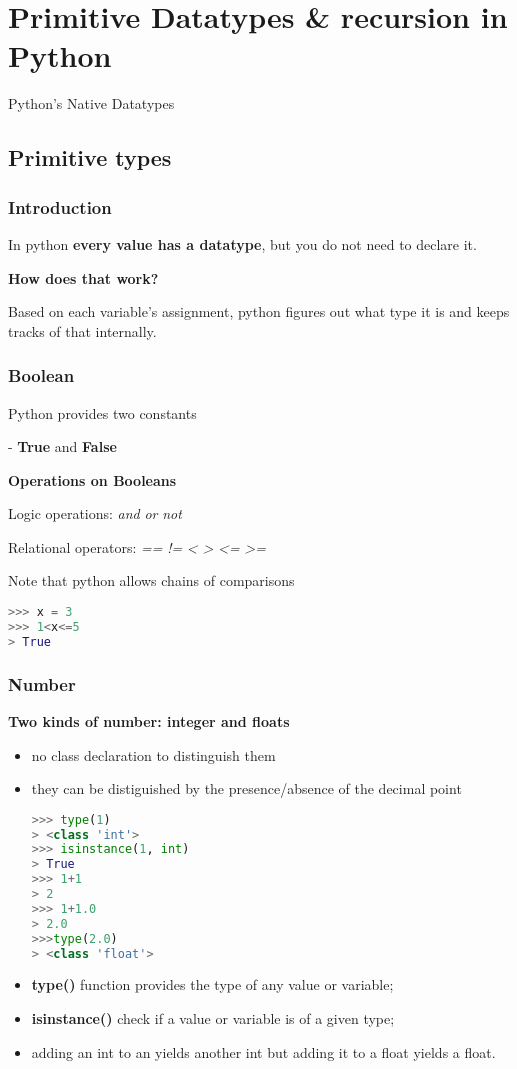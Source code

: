 \section{Primitive Datatypes \& recursion in Python}

Python's Native Datatypes

\subsection{Primitive types}

\subsubsection{Introduction}
In python \textbf{every value has a datatype}, but you do not need to declare it.

\textbf{How does that work?}

Based on each variable's assignment, python figures out what type it is and keeps tracks of that internally.

\subsubsection{Boolean}
Python provides two constants

- \textbf{True} and \textbf{False}

\textbf{Operations on Booleans}

Logic operations: \textit{and} \textit{or} \textit{not}

Relational operators: \textit{==} \textit{!=} \textit{<} \textit{>} \textit{<=} \textit{>=}

Note that python allows chains of comparisons
\begin{lstlisting}[language=Python]
>>> x = 3
>>> 1<x<=5
> True
\end{lstlisting}

\subsubsection{Number}
\textbf{Two kinds of number: integer and floats}
\begin{itemize}
	\item no class declaration to distinguish them
	\item they can be distiguished by the presence/absence of the decimal point
\begin{lstlisting}[language=Python]
>>> type(1)
> <class 'int'>
>>> isinstance(1, int)
> True
>>> 1+1
> 2
>>> 1+1.0
> 2.0
>>>type(2.0)
> <class 'float'>
\end{lstlisting}
	\item \textbf{type()} function provides the type of any value or variable;
	\item \textbf{isinstance()} check if a value or variable is of a given type;
	\item adding an int to an yields another int but adding it to a float yields a float.
\end{itemize}

